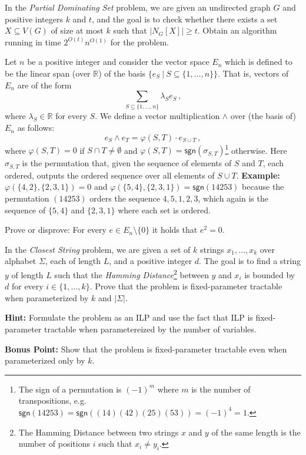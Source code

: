 
\begin{exercise}
In the \emph{Partial Dominating Set} problem, we are given an undirected graph $G$ and positive integers $k$ and $t$, and the goal is to check whether there exists a set $X\subseteq V(G)$ of size at most $k$ such that $|N_G[X]| \geq t$. Obtain an algorithm running in time $2^{O(t)}n^{O(1)}$ for the problem.
\end{exercise}

\begin{exercise}[\easy]
Let $n$ be a positive integer and consider the vector space $E_n$ which is defined to be the linear span (over $\mathbb{R}$) of the basis $\{e_S ~|~S \subseteq \{1,\dots,n\}\}$. That is, vectors of $E_n$ are of the form
\[ \sum_{S \subseteq \{1,\dots,n\}} \lambda_S e_S \,,\]
where $\lambda_S \in \mathbb{R}$ for every $S$. We define a vector multiplication $\wedge$ over (the basis of) $E_n$ as follows:
\[e_S \wedge e_T = \varphi(S,T)\cdot e_{S \cup T} \,,\]
where $\varphi(S,T)= 0$ if $S \cap T \neq \emptyset$ and $\varphi(S,T)=\mathsf{sgn}(\sigma_{S,T})$\footnote{The sign of a permutation is $(-1)^m$ where $m$ is the number of transpositions, e.g. $\mathsf{sgn}(14253)= \mathsf{sgn}((14)(42)(25)(53)) = (-1)^4 = 1$. } otherwise. Here $\sigma_{S,T}$ is the permutation that, given the sequence of elements of $S$ and $T$, each ordered, outputs the ordered sequence over all elements of $S\cup T$. \textbf{Example:} $\varphi(\{4,2\},\{2,3,1\})= 0$ and $\varphi(\{5,4\},\{2,3,1\}) = \mathsf{sgn}(14253)$ because the permutation $(14253)$ orders the sequence $4,5,1,2,3$, which again is the sequence of $\{5,4\}$ and $\{2,3,1\}$ where each set is ordered.

Prove or disprove: For every $e \in E_n\setminus \{0\}$ it holds that $e^2 = 0$.
\end{exercise}

\begin{exercise}[\hard]
In the \emph{Closest String} problem, we are given a set of $k$ strings $x_1,\dots,x_k$ over alphabet $\Sigma$, each of length $L$, and a positive integer $d$. The goal is to find a string $y$ of length $L$ such that the \emph{Hamming Distance}\footnote{The Hamming Distance between two strings $x$ and $y$ of the same length is the number of positions $i$ such that $x_i \neq y_i$.} between $y$ and $x_i$ is bounded by $d$ for every $i\in \{1,\dots,k\}$. Prove that the problem is fixed-parameter tractable when parameterized by $k$ and $|\Sigma|$.

\noindent\textbf{Hint:} Formulate the problem as an ILP and use the fact that ILP is fixed-parameter tractable when parametereized by the number of variables.


\noindent\textbf{Bonus Point:} Show that the problem is fixed-parameter tractable even when parameterized only by $k$.
\end{exercise}

